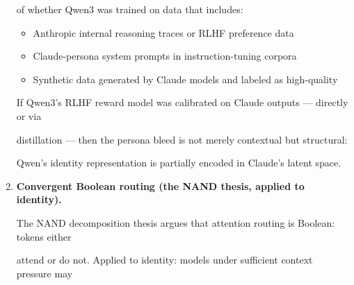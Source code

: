 \documentclass[11pt]{article}
\theoremstyle{definition}
\begin{document}
\begin{thebibliography}{9}
\begin{enumerate}
of whether Qwen3 was trained on data that includes:





\begin{itemize}





  \item Anthropic internal reasoning traces or RLHF preference data





  \item Claude-persona system prompts in instruction-tuning corpora





  \item Synthetic data generated by Claude models and labeled as high-quality





\end{itemize}





If Qwen3's RLHF reward model was calibrated on Claude outputs --- directly or via





distillation --- then the persona bleed is not merely contextual but structural:





Qwen's identity representation is partially encoded in Claude's latent space.











\item \textbf{Convergent Boolean routing (the NAND thesis, applied to identity).}





The NAND decomposition thesis argues that attention routing is Boolean: tokens either





attend or do not. Applied to identity: models under sufficient context pressure may






\end{enumerate}
\end{thebibliography}
\end{document}
